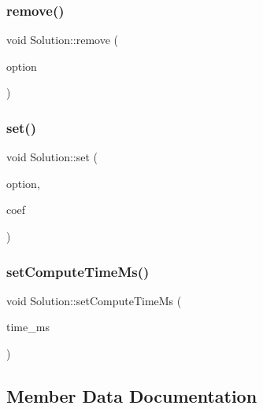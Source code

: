 \subsubsection{\texorpdfstring{remove()}{remove()}}
{\footnotesize\ttfamily void Solution\+::remove (\begin{DoxyParamCaption}\item[{const \hyperlink{class_restoration_plan_1_1_option}{Restoration\+Plan\+::\+Option} $\ast$}]{option }\end{DoxyParamCaption})\hspace{0.3cm}{\ttfamily [inline]}}

\mbox{\label{class_solution_ac29d6eca7b0755057b82c95610b763c8}} 
\subsubsection{\texorpdfstring{set()}{set()}}
{\footnotesize\ttfamily void Solution\+::set (\begin{DoxyParamCaption}\item[{const \hyperlink{class_restoration_plan_1_1_option}{Restoration\+Plan\+::\+Option} $\ast$}]{option,  }\item[{double}]{coef }\end{DoxyParamCaption})\hspace{0.3cm}{\ttfamily [inline]}}

\mbox{\label{class_solution_a24101fa88cf1e685abd9652148e4f1fb}} 
\subsubsection{\texorpdfstring{set\+Compute\+Time\+Ms()}{setComputeTimeMs()}}
{\footnotesize\ttfamily void Solution\+::set\+Compute\+Time\+Ms (\begin{DoxyParamCaption}\item[{int}]{time\+\_\+ms }\end{DoxyParamCaption})\hspace{0.3cm}{\ttfamily [inline]}}



\subsection{Member Data Documentation}
\mbox{\label{class_solution_a12d788f2b7fa64050d2e3c0e3f4464f3}} 
